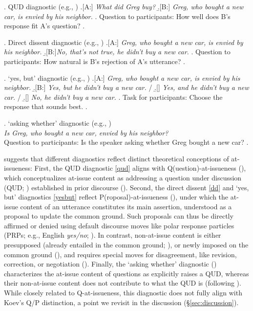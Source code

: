 \documentclass[times,linguex,xcolor]{glossa}
\begin{document}
  \ex. \label{qud}%
    QUD diagnostic (e.g., \citealt{tonhauser_diagnosing_2012,chen_presuppositions_2024})
    \a.[A:] \emph{What did Greg buy?}
    \b.[B:] \emph{Greg, who bought a new car, is envied by his neighbor.}
    \z.
    Question to participants: How well does B's response fit A's question?
  \z.

  \ex. \label{dd} Direct dissent diagnostic (e.g., \citealt{tonhauser_diagnosing_2012,syrett_experimental_2015})
    \a.[A:] \emph{Greg, who bought a new car, is envied by his neighbor.}
    \b.[B:]\emph{No, that's not true, he didn't buy a new car.}
    \z.
  Question to participants: How natural is B's rejection of A's utterance?
  \z.

  \ex. \label{yesbut}%
    `yes, but' diagnostic (e.g., \citealt{xue_correlation_2011,destruel_cross-linguistic_2015})
    \a.[A:] \emph{Greg, who bought a new car, is envied by his neighbor.}
    \b.[B:] \emph{Yes, but he didn't buy a new car.} /
    \b.[] \emph{Yes, and he didn't buy a new car.} /
    \b.[] \emph{No, he didn't buy a new car.}
    \z.
    Task for participants: Choose the response that sounds best.
  \z.

  \ex. \label{aw}%
    `asking whether' diagnostic (e.g., \citealt{tonhauser_how_2018,solstad_cataphoric_2024})\smallskip\\
      \emph{Is Greg, who bought a new car, envied by his neighbor?}\smallskip
  \\ Question to participants: Is the speaker asking whether Greg bought a new car?
  \z.

  \citealt{koev_notions_2018} suggests that different diagnostics reflect distinct theoretical conceptions of at-issueness: First, the QUD diagnostic \ref{qud} aligns with Q(uestion)-at-issueness (\citealt{simons_what_2010}), which conceptualizes at-issue content as addressing a question under discussion (QUD; \citealt{roberts_information_1996,ginzburg_interrogatives_1996}) established in prior discourse (\citealt{amaral_review_2007}).
  Second, the direct dissent \ref{dd} and `yes, but' diagnostics \ref{yesbut} reflect P(roposal)-at-issueness (\citealt{koev_apposition_2013}), under which the at-issue content of an utterance constitutes its main assertion, understood as a proposal to update the common ground. Such proposals can thus be directly affirmed or denied using default discourse moves like polar response particles (PRPs; e.g., English \emph{yes/no}; \citealt{farkas_reacting_2010}). In contrast, non-at-issue content is either presupposed (already entailed in the common ground; \citealt{stalnaker_presuppositions_1973,stalnaker_common_2002}), or newly imposed on the common ground (\citealt{murray_varieties_2014,anderbois_at-issue_2015}), and requires special moves for disagreement, like revision, correction, or negotiation (\citealt{potts_logic_2005}).
  Finally, the `asking whether' diagnostic (\citealt{tonhauser_how_2018}) characterizes the at-issue content of questions as explicitly raises a QUD, whereas their non-at-issue content does not contribute to what the QUD is (following \citealt{roberts_information_1996}). While closely related to Q-at-issueness, this diagnostic does not fully align with Koev’s Q/P distinction, a point we revisit in the discussion (§\ref{sec:discussion}).
\end{document}
